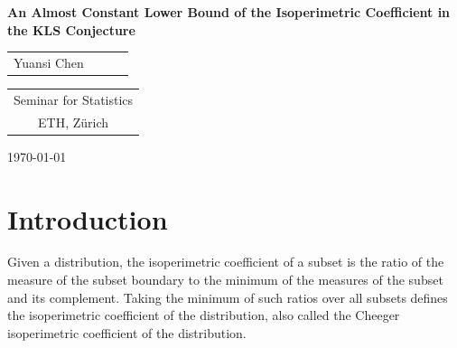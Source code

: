 \documentclass[11pt,twoside]{article}
\theoremstyle{named}
\theoremstyle{plain}
\newcommand{\usedim}{\ensuremath{d}}
\newcommand{\dims}{\usedim}
\begin{document}

\begin{center}

{\bf{\LARGE{An Almost Constant Lower Bound of the Isoperimetric Coefficient in the KLS Conjecture}}}

\vspace*{.2in}


{\large{
\begin{tabular}{cccc}
Yuansi Chen\\
\end{tabular}
}}

\vspace*{.2in}

\begin{tabular}{c}
Seminar for Statistics \\
ETH, Z\"urich
\end{tabular}

\vspace*{.2in}


\today

\vspace*{.2in}

\begin{abstract}
We prove an almost constant lower bound of the isoperimetric coefficient in the KLS conjecture. The lower bound has the dimension dependency $\dims^{-o_d(1)}$. When the dimension is large enough, our lower bound is tighter than the previous best bound which has the dimension dependency $\dims^{-1/4}$. Improving the current best lower bound of the isoperimetric coefficient in the KLS conjecture has many implications, including improvements of the current best bounds in Bourgain's slicing conjecture and in the thin-shell conjecture, better concentration inequalities for Lipschitz functions of log-concave measures and better mixing time bounds for MCMC sampling algorithms on log-concave measures.
\end{abstract}

\end{center}



\section{Introduction} %
\label{sec:introduction}
Given a distribution, the isoperimetric coefficient of a subset is the ratio of the measure of the subset boundary to the minimum of the measures of the subset and its complement. Taking the minimum of such ratios over all subsets defines the isoperimetric coefficient of the distribution, also called the Cheeger isoperimetric coefficient of the distribution.
\end{document}
